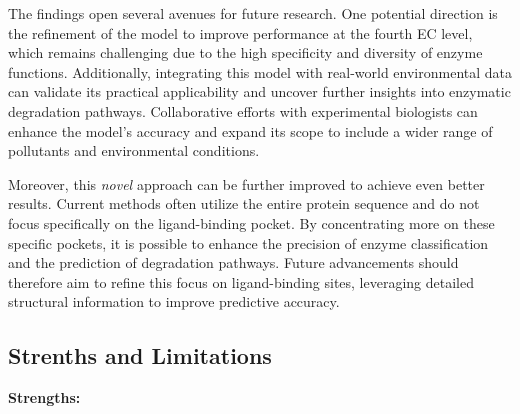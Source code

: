 The findings open several avenues for future research. One potential direction is the refinement of the model to improve performance at the fourth EC level, which remains challenging due to the high specificity and diversity of enzyme functions. Additionally, integrating this model with real-world environmental data can validate its practical applicability and uncover further insights into enzymatic degradation pathways. Collaborative efforts with experimental biologists can enhance the model's accuracy and expand its scope to include a wider range of pollutants and environmental conditions.

Moreover, this \textit{novel} approach can be further improved to achieve even better results. Current methods often utilize the entire protein sequence and do not focus specifically on the ligand-binding pocket. By concentrating more on these specific pockets, it is possible to enhance the precision of enzyme classification and the prediction of degradation pathways. Future advancements should therefore aim to refine this focus on ligand-binding sites, leveraging detailed structural information to improve predictive accuracy.


\subsection{Strenths and Limitations}
\label{sec:Strenths and Limitations}

\textbf{Strengths:}

